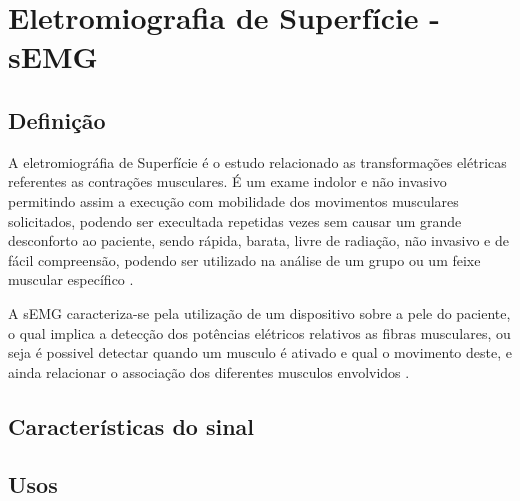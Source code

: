 \chapter{Eletromiografia de Superfície - sEMG}
\section{Definição}
A eletromiográfia de Superfície é o estudo relacionado as transformações elétricas referentes as contrações musculares. É um exame indolor e não invasivo permitindo assim a execução com mobilidade dos movimentos musculares solicitados, podendo ser execultada repetidas vezes sem causar um grande desconforto ao paciente, sendo rápida, barata, livre de radiação, não invasivo e de fácil compreensão, podendo ser utilizado na análise de um grupo ou um feixe muscular específico \cite{de2010eletromiografia}.

A sEMG caracteriza-se pela utilização de um dispositivo sobre a pele do paciente, o qual implica a detecção dos potências elétricos relativos as fibras musculares, ou seja é possivel detectar quando um musculo é ativado e qual o movimento deste, e ainda relacionar o associação dos diferentes musculos envolvidos \cite{botelho2010avaliaccao}.

\section{Características do sinal}
\section{Usos}
